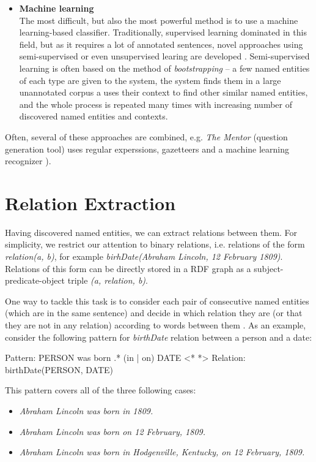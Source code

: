 \documentclass[12pt, twoside]{fithesis2}		%
\renewcommand{\_}{\leavevmode \kern0.07em\vbox{\hrule width0.4em}}
\newcommand{\squarebullet}{\textcolor{black}{\raisebox{0.15em}{\rule{4pt}{4pt}}}}
\newcommand{\emptysquarebullet}{\textcolor{black}{\raisebox{0.10em}{\tiny$\square$}}}
\newenvironment{myItemize}{
  \begin{itemize}[leftmargin=2em,rightmargin=1em,itemsep=\parskip ,parsep=0em,topsep=0em,partopsep=0em]
  \renewcommand{\labelitemi}{\squarebullet}
  \renewcommand{\labelitemii}{\textbullet}
}{
  \end{itemize}
}
\newcommand{\arrowlinesplit}{%
  \noindent\makebox[\linewidth]{\raisebox{0.15em}{\rule{0.478\textwidth}{0.5pt}}%
  ~$\downarrow$~%
  \noindent\raisebox{0.15em}{\rule{0.478\textwidth}{0.5pt}}}%
}
\begin{document}
\begin{myItemize}
\item \textbf{Machine learning}\\
  The most difficult, but also the most powerful method is to use a machine learning-based classifier.
  Traditionally, supervised learning dominated in this field,
  but as it requires a lot of annotated sentences,
  novel approaches using semi-supervised or even unsupervised learing are developed
  \cite{named-entity-recognition}.
  Semi-supervised learning is often based on the method of \emph{bootstrapping} -- a few named entities of each type are given to the system, the system finds them in a large unannotated corpus a uses their context to find other similar named entities, and the whole process is repeated many times with increasing number of discovered named entities and contexts.
\end{myItemize}
Often, several of these approaches are combined, e.g. \textit{The Mentor} (question generation tool) uses regular experssions, gazetteers and a machine learning recognizer \cite{mentor}).


\section{Relation Extraction}
\label{sec:relations-extraction}

Having discovered named entities, we can extract relations between them.
For simplicity, we restrict our attention to binary relations,
i.e. relations of the form \emph{relation(a, b)},
for example \emph{birhDate(Abraham Lincoln, 12 February 1809)}.
Relations of this form can be directly stored in a RDF graph as a subject-predicate-object triple
\emph{(a, relation, b)}.

One way to tackle this task is to consider each pair of consecutive named entities (which are in the same sentence) and decide in which relation they are (or that they are not in any relation) according to words between them \cite[][284]{nlp-python}.
As an example, consider the following pattern for \emph{birthDate} relation between a person and a date:
\begin{code}
Pattern: PERSON was born .* (in | on) DATE
<*\arrowlinesplit*>
Relation: birthDate(PERSON, DATE)
\end{code}
This pattern covers all of the three following cases:
\begin{myItemize}
  \item \emph{Abraham Lincoln was born in 1809.}
  \item \emph{Abraham Lincoln was born on 12 February, 1809.}
  \item \emph{Abraham Lincoln was born in Hodgenville, Kentucky, on 12 February, 1809.}
\end{myItemize}
\end{document}
